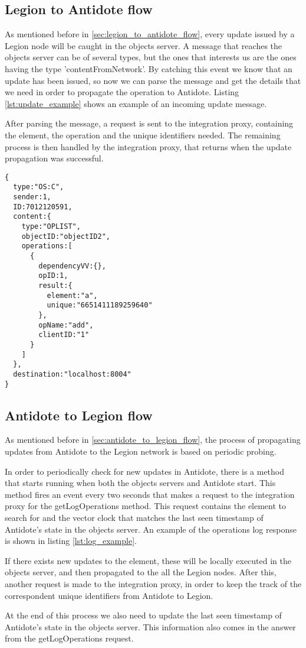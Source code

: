 \subsection{Legion to Antidote flow}
\label{sec:legion_changes_legion_to_antidote_flow}
As mentioned before in \ref{sec:legion_to_antidote_flow}, every update issued by a Legion node will be caught in the objects server. A message that reaches the objects server can be of several types, but the ones that interests us are the ones having the type 'contentFromNetwork'. By catching this event we know that an update has been issued, so now we can parse the message and get the details that we need in order to propagate the operation to Antidote. Listing \ref{lst:update_example} shows an example of an incoming update message.\par
	After parsing the message, a request is sent to the integration proxy, containing the element, the operation and the unique identifiers needed. The remaining process is then handled by the integration proxy, that returns when the update propagation was successful.

\begin{lstlisting}[caption={Legion update content message example},label={lst:update_example}]
{
  type:"OS:C",
  sender:1,
  ID:7012120591,
  content:{
    type:"OPLIST",
    objectID:"objectID2",
    operations:[
      {
        dependencyVV:{},
        opID:1,
        result:{
          element:"a",
          unique:"6651411189259640"
        },
        opName:"add",
        clientID:"1"
      }
    ]
  },
  destination:"localhost:8004"
}
\end{lstlisting}

\subsection{Antidote to Legion flow}
\label{sec:legion_changes_antidote to legion flow}
As mentioned before in \ref{sec:antidote_to_legion_flow}, the process of propagating updates from Antidote to the Legion network is based on periodic probing.\par
	In order to periodically check for new updates in Antidote, there is a method that starts running when both the objects servers and Antidote start. This method fires an event every two seconds that makes a request to the integration proxy for the getLogOperations method. This request contains the element to search for and the vector clock that matches the last seen timestamp of Antidote's state in the objects server. An example of  the operations log response is shown in listing \ref{lst:log_example}.\par
	If there exists new updates to the element, these will be locally executed in the objects server, and then propagated to the all the Legion nodes. After this, another request is made to the integration proxy, in order to keep the track of the correspondent unique identifiers from Antidote to Legion.\par
	At the end of this process we also need to update the last seen timestamp of Antidote's state in the objects server. This information also comes in the answer from the getLogOperations request.
	
